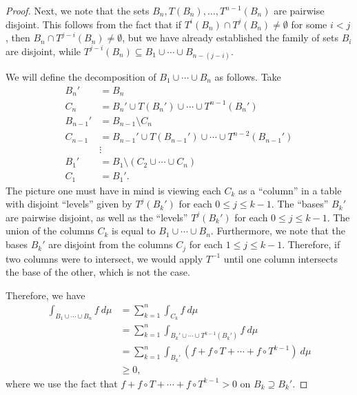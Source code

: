 \documentclass[10pt]{mypackage}
\begin{document}
\begin{proof}
  Next, we note that the sets $B_n,T\left( B_n \right),\dots,T^{n-1}\left( B_n \right)$ are pairwise disjoint. This follows from the fact that if $T^{i}\left( B_n \right)\cap T^{j}\left( B_n \right)\neq \emptyset$ for some $i < j$, then $B_n\cap T^{j-i}\left( B_n \right)\neq \emptyset$, but we have already established the family of sets $B_i$ are disjoint, while $T^{j-i}\left( B_n \right)\subseteq B_1\cup\cdots\cup B_{n-(j-i)}$.

  We will define the decomposition of $B_1\cup\cdots\cup B_{n}$ as follows. Take
  \begin{align*}
    B_n' &= B_n\\
    C_n &= B_n'\cup T\left( B_n' \right)\cup\cdots\cup T^{n-1}\left( B_n' \right)\\
    B_{n-1}' &= B_{n-1}\setminus C_n\\
    C_{n-1} &= B_{n-1}'\cup T\left( B_{n-1}' \right) \cup\cdots\cup T^{n-2}\left( B_{n-1}' \right)\\
            &\vdots\\
    B_1' &= B_1\setminus \left( C_2\cup\cdots\cup C_n \right)\\
    C_1 &= B_1'.
  \end{align*}
  The picture one must have in mind is viewing each $C_k$ as a ``column'' in a table with disjoint ``levels'' given by $T^{j}\left( B_k' \right)$ for each $0\leq j \leq k-1$. The ``bases'' $B_k'$ are pairwise disjoint, as well as the ``levels'' $T^{j}\left( B_k' \right)$ for each $0\leq j \leq k-1$. The union of the columns $C_k$ is equal to $B_1\cup\cdots\cup B_n$. Furthermore, we note that the bases $B_k'$ are disjoint from the columns $C_{j}$ for each $1\leq j \leq k-1$. Therefore, if two columns were to intersect, we would apply $T^{-1}$ until one column intersects the base of the other, which is not the case.

  Therefore, we have
  \begin{align*}
    \int_{B_1\cup\cdots\cup B_n}^{} f\:d\mu &= \sum_{k=1}^{n} \int_{C_k}^{} f\:d\mu\\
                                            &= \sum_{k=1}^{n}\int_{B_k'\cup\cdots\cup T^{k-1}\left( B_k' \right)}^{} f\:d\mu\\
                                            &= \sum_{k=1}^{n} \int_{B_k'}^{} \left( f + f\circ T + \cdots + f\circ T^{k-1} \right)\:d\mu\\
                                            &\geq 0,
  \end{align*}
  where we use the fact that $f + f\circ T + \cdots + f\circ T^{k-1} > 0$ on $B_k\supseteq B_k'$.
\end{proof}
\end{document}
